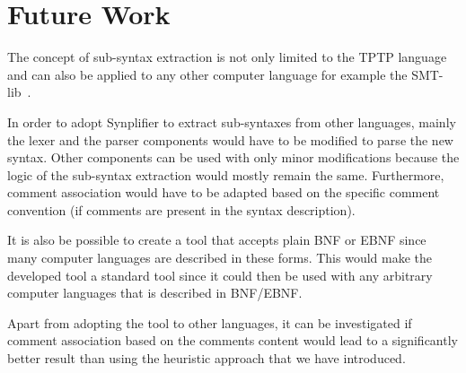 \section{Future Work}\label{sec:FutureWork}
The concept of sub-syntax extraction is not only limited to the \ac{TPTP} language and can also be applied to any other computer language for example the SMT-lib~\cite{BFT-SMTLIB-17}.

In order to adopt \ac{Synplifier} to extract sub-syntaxes from other languages, mainly the lexer and the parser components would have to be modified to parse the new syntax. Other components can be used with only minor modifications because the logic of the sub-syntax extraction would mostly remain the same.
Furthermore, comment association would have to be adapted based on the specific comment convention (if comments are present in the syntax description).

It is also be possible to create a tool that accepts plain \ac{BNF} or \ac{EBNF} since many computer languages are described in these forms. This would make the developed tool a standard tool since it could then be used with any arbitrary computer languages that is described in \ac{BNF}/\ac{EBNF}.

Apart from adopting the tool to other languages, it can be investigated if comment association based on the comments content would lead to a significantly better result than using the heuristic approach that we have introduced.
